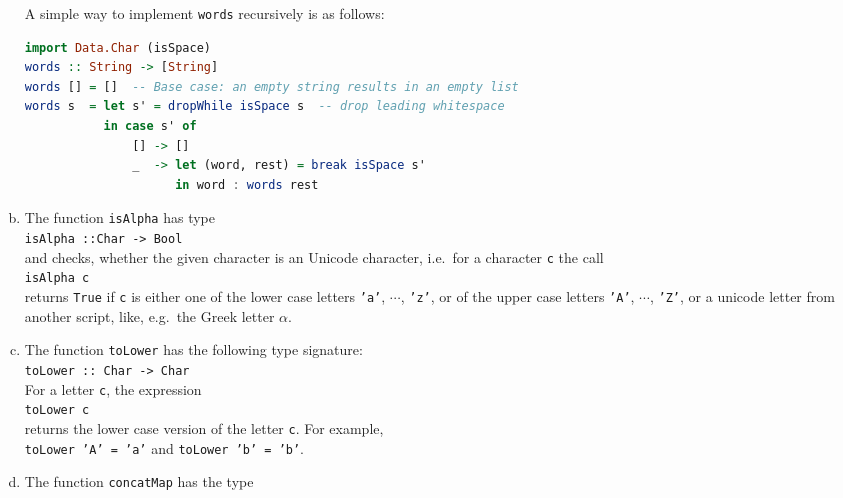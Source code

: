 \begin{enumerate}[(a)]
      A simple way to implement \texttt{words} recursively is as follows:
      \begin{lstlisting}[style=haskellstyle, language=Haskell]
import Data.Char (isSpace)
words :: String -> [String]
words [] = []  -- Base case: an empty string results in an empty list
words s  = let s' = dropWhile isSpace s  -- drop leading whitespace
           in case s' of
               [] -> []  
               _  -> let (word, rest) = break isSpace s'  
                     in word : words rest  
\end{lstlisting}
      
\item The function \texttt{isAlpha} has type
      \\[0.2cm]
      \hspace*{1.3cm}
      \texttt{isAlpha ::\;Char -> Bool}
      \\[0.2cm]
      and checks, whether the given character is an  Unicode character, i.e.~for a
      character \texttt{c} the call
      \\[0.2cm]
      \hspace*{1.3cm}
      \texttt{isAlpha c}
      \\[0.2cm]
      returns \texttt{True} if \texttt{c} is either one of the lower case letters \texttt{'a'}, $\cdots$,
      \texttt{'z'}, or of the upper case letters \texttt{'A'}, $\cdots$, \texttt{'Z'}, or a
      unicode letter from another script, like, e.g.~the Greek letter $\alpha$.            
\item The function \texttt{toLower} has the following type signature:
      \\[0.2cm]
      \hspace*{1.3cm}
      \texttt{toLower :: Char -> Char}
      \\[0.2cm]
      For a letter \texttt{c}, the expression 
      \\[0.2cm]
      \hspace*{1.3cm}
      \texttt{toLower c}
      \\[0.2cm]
      returns the lower case version of the letter \texttt{c}.  For example,
      \\[0.2cm]
      \hspace*{1.3cm}
      \texttt{toLower 'A' = 'a'} \quad and \quad \texttt{toLower 'b' = 'b'}.
\item The function \texttt{concatMap} has the type
      \\[0.2cm]
      \hspace*{1.3cm}

\end{enumerate}
